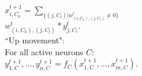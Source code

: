 \documentclass{beamer}
\newcommand{\msgray}[1]{{\color{mygray} #1}}
\begin{document}
\begin{frame}
\begin{columns}[T]
\begin{column}{0.3\textwidth}
{\scriptsize$x_{i,C_k}^{t+1} = \sum_{\{(j,C_l) | w_{(i,C_k), (j,C_l)}^t \neq 0\}}$\\[0.1ex]$w_{(i,C_k), (j,C_l)}^t * y_{j, C_l}^{t}.$}\\[3ex]

\msgray{``Up movement":\\[0.1ex]  

For all active neurons $C$:\\[1ex]

{\scriptsize $y^{t+1}_{1,C},...,y^{t+1}_{n,C} = f_C (x^{t+1}_{1,C},...,x^{t+1}_{m,C})$.}
}

\end{column}
\end{columns}



\end{frame}
\end{document}
